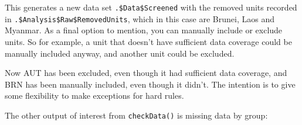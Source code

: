 \documentclass[
]{book}
\newenvironment{Shaded}{\begin{snugshade}}{\end{snugshade}}
\newcommand{\AttributeTok}[1]{\textcolor[rgb]{0.77,0.63,0.00}{#1}}
\newcommand{\CommentTok}[1]{\textcolor[rgb]{0.56,0.35,0.01}{\textit{#1}}}
\newcommand{\ConstantTok}[1]{\textcolor[rgb]{0.00,0.00,0.00}{#1}}
\newcommand{\DocumentationTok}[1]{\textcolor[rgb]{0.56,0.35,0.01}{\textbf{\textit{#1}}}}
\newcommand{\FloatTok}[1]{\textcolor[rgb]{0.00,0.00,0.81}{#1}}
\newcommand{\FunctionTok}[1]{\textcolor[rgb]{0.00,0.00,0.00}{#1}}
\newcommand{\NormalTok}[1]{#1}
\newcommand{\OtherTok}[1]{\textcolor[rgb]{0.56,0.35,0.01}{#1}}
\newcommand{\SpecialCharTok}[1]{\textcolor[rgb]{0.00,0.00,0.00}{#1}}
\newcommand{\StringTok}[1]{\textcolor[rgb]{0.31,0.60,0.02}{#1}}
\begin{document}
This generates a new data set \texttt{.\$Data\$Screened} with the removed units recorded in \texttt{.\$Analysis\$Raw\$RemovedUnits}, which in this case are Brunei, Laos and Myanmar. As a final option to mention, you can manually include or exclude units. So for example, a unit that doesn't have sufficient data coverage could be manually included anyway, and another unit could be excluded.

\begin{Shaded}
\end{Shaded}

Now AUT has been excluded, even though it had sufficient data coverage, and BRN has been manually included, even though it didn't. The intention is to give some flexibility to make exceptions for hard rules.

The other output of interest from \texttt{checkData()} is missing data by group:
\end{document}
